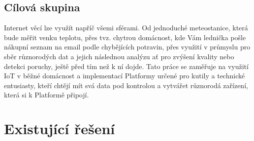 \documentclass[thesis=B,czech]{FITthesis}[2019/12/23]
\begin{document}
\subsection{Cílová skupina}
    Internet věcí lze využít napříč všemi sférami. Od jednoduché meteostanice, která bude měřit venku teplotu, přes tvz. chytrou domácnost, kde Vám lednička pošle nákupní seznam na email podle chybějících potravin, přes využití v průmyslu pro sběr různorodých dat a jejich následnou analýzu ať pro zvýšení kvality nebo detekci poruchy, ještě před tím než k ní dojde. Tato práce se zaměřuje na využití IoT v běžné domácnost a implementací Platformy určené pro kutily a technické entusiasty, kteří chtějí mít svá data pod kontrolou a vytvářet různorodá zařízení, která si k Platformě připojí.
 





\section{Existující řešení}
\end{document}
